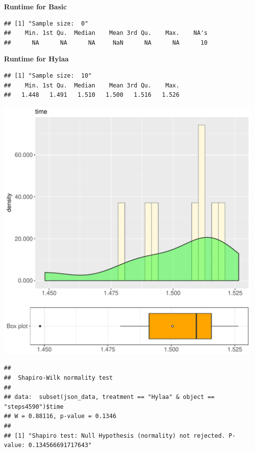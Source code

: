 \documentclass{article}\usepackage[]{graphicx}\usepackage[]{color}
\makeatletter
\def\maxwidth{ %
  \ifdim\Gin@nat@width>\linewidth
    \linewidth
  \else
    \Gin@nat@width
  \fi
}
\newenvironment{kframe}{%
 \def\at@end@of@kframe{}%
 \ifinner\ifhmode%
  \def\at@end@of@kframe{\end{minipage}}%
  \begin{minipage}{\columnwidth}%
 \fi\fi%
 \def\FrameCommand##1{\hskip\@totalleftmargin \hskip-\fboxsep
 \colorbox{shadecolor}{##1}\hskip-\fboxsep
     \hskip-\linewidth \hskip-\@totalleftmargin \hskip\columnwidth}%
 \MakeFramed {\advance\hsize-\width
   \@totalleftmargin\z@ \linewidth\hsize
   \@setminipage}}%
 {\par\unskip\endMakeFramed%
 \at@end@of@kframe}
\newenvironment{knitrout}{}{} %
\makeatother
\begin{document}
 \textbf{Runtime for Basic}
\begin{knitrout}
\color{fgcolor}\begin{kframe}
\begin{verbatim}
## [1] "Sample size:  0"
##    Min. 1st Qu.  Median    Mean 3rd Qu.    Max.    NA's 
##      NA      NA      NA     NaN      NA      NA      10
\end{verbatim}
\end{kframe}
\end{knitrout}
 \textbf{Runtime for Hylaa}
\begin{knitrout}
\color{fgcolor}\begin{kframe}
\begin{verbatim}
## [1] "Sample size:  10"
##    Min. 1st Qu.  Median    Mean 3rd Qu.    Max. 
##   1.448   1.491   1.510   1.500   1.516   1.526
\end{verbatim}
\end{kframe}
\includegraphics[width=\maxwidth]{figure/RH3_Hylaa_steps4590-1} 
\begin{kframe}\begin{verbatim}
## 
## 	Shapiro-Wilk normality test
## 
## data:  subset(json_data, treatment == "Hylaa" & object == "steps4590")$time
## W = 0.88116, p-value = 0.1346
## 
## [1] "Shapiro test: Null Hypothesis (normality) not rejected. P-value: 0.134566691717643"
\end{verbatim}
\end{kframe}
\end{knitrout}
  
\end{document}
